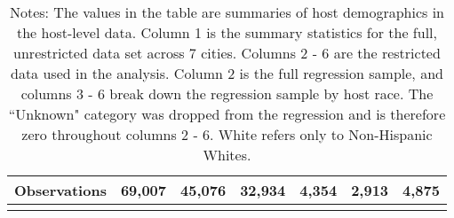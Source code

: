 {\begin{longtable}{l*{6}{c}}
		
		\hline
		Observations    &69,007  & 45,076   &       32,934      &    4,354       &     2,913    &      4,875       \\
		\hline\hline
		\caption*{Notes: The values in the table are summaries of host demographics in the host-level data. Column 1 is the summary statistics for the full, unrestricted data set across 7 cities. Columns 2 - 6 are the restricted data used in the analysis. Column 2 is the full regression sample, and columns 3 - 6 break down the regression sample by host race. The ``Unknown" category was dropped from the regression and is therefore zero throughout columns 2 - 6. White refers only to Non-Hispanic Whites.}
		
	\end{longtable}
}

